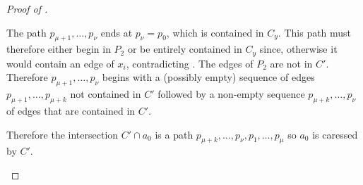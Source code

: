 \documentclass{patmorin}
\begin{document}
\begin{proof}[Proof of ]
\begin{enumerate}
\begin{enumerate}
     The path $p_{\mu+1},\ldots,p_{\nu}$ ends at $p_\nu=p_0$, which is contained in $C_y$. This path must therefore either begin in $P_2$ or be entirely contained in $C_y$ since, otherwise it would contain an edge of $x_i$, contradicting .  The edges of $P_2$ are not in $C'$. Therefore $p_{\mu+1},\ldots,p_{\nu}$ begins with a (possibly empty) sequence of edges $p_{\mu+1},\ldots,p_{\mu+k}$ not contained in $C'$ followed by a non-empty sequence $p_{\mu+k},\ldots,p_\nu$ of edges that are contained in $C'$.
  \end{enumerate}
  Therefore the intersection $C'\cap a_0$ is a path $p_{\mu+k},\ldots,p_\nu,p_1,\ldots,p_{\mu}$ so $a_0$ is caressed by $C'$. \qedhere
\end{enumerate}
%
%
%
%

\end{proof}
\end{document}
